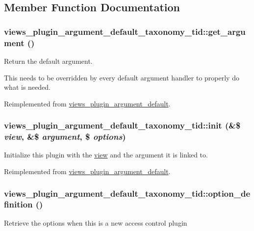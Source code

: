 \subsection{Member Function Documentation}
\hypertarget{classviews__plugin__argument__default__taxonomy__tid_a60700fa190086256f0fe26034320faff}{
\subsubsection[{get\_\-argument}]{\setlength{\rightskip}{0pt plus 5cm}views\_\-plugin\_\-argument\_\-default\_\-taxonomy\_\-tid::get\_\-argument ()}}
\label{classviews__plugin__argument__default__taxonomy__tid_a60700fa190086256f0fe26034320faff}
Return the default argument.

This needs to be overridden by every default argument handler to properly do what is needed. 

Reimplemented from \hyperlink{classviews__plugin__argument__default_a8e67864f4a1ce20b12bc82afe1acd255}{views\_\-plugin\_\-argument\_\-default}.\hypertarget{classviews__plugin__argument__default__taxonomy__tid_a944b41dc55d61139357d7b343d0a185e}{
\subsubsection[{init}]{\setlength{\rightskip}{0pt plus 5cm}views\_\-plugin\_\-argument\_\-default\_\-taxonomy\_\-tid::init (\&\$ {\em view}, \/  \&\$ {\em argument}, \/  \$ {\em options})}}
\label{classviews__plugin__argument__default__taxonomy__tid_a944b41dc55d61139357d7b343d0a185e}
Initialize this plugin with the \hyperlink{classview}{view} and the argument it is linked to. 

Reimplemented from \hyperlink{classviews__plugin__argument__default_a42928a46a7152d94beae91f781a5b845}{views\_\-plugin\_\-argument\_\-default}.\hypertarget{classviews__plugin__argument__default__taxonomy__tid_acabe57c2f1f0dffd6775cc339bfb9d7e}{
\subsubsection[{option\_\-definition}]{\setlength{\rightskip}{0pt plus 5cm}views\_\-plugin\_\-argument\_\-default\_\-taxonomy\_\-tid::option\_\-definition ()}}
\label{classviews__plugin__argument__default__taxonomy__tid_acabe57c2f1f0dffd6775cc339bfb9d7e}
Retrieve the options when this is a new access control plugin 


